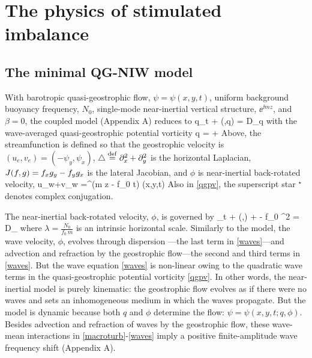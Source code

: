 \documentclass{jfm}
\begin{document}
\section{The physics of stimulated imbalance}

\subsection{The \cite{xie_vanneste2015} minimal QG-NIW model}

With barotropic quasi-geostrophic flow, $\psi=\psi(x,y,t)$,
uniform background buoyancy frequency, $N_0$,
single-mode near-inertial vertical structure, $\ee^{\ii m z}$, and
 $\beta = 0$, the \cite{xie_vanneste2015}
coupled model (Appendix A) reduces to
\beq
\label{macroturb}
q_t + \sJ(\psi,q) = D_q\com
\eeq
with the wave-averaged quasi-geostrophic potential vorticity
\beq
\label{qgpv}
q = \lap \psi +
                 \per
\eeq
Above, the streamfunction is defined so that the geostrophic velocity is
$(u_e, v_e) = (-\psi_y, \psi_x)$, $\triangle \stackrel{\mathrm{def}}{=} \partial_x^2 + \partial_y^2$ is the horizontal
Laplacian, $J(f,g)=f_x g_y - f_y g_x$ is the lateral Jacobian, and $\phi$
is near-inertial back-rotated velocity,
\beq
\label{niw_velocity}
u_w+\ii v_w  =\ee^{\ii (m z - f_0 t)} \phi(x,y,t)\per
\eeq
Also in \eqref{qgpv}, the superscript star $^\star$ denotes complex conjugation.

The near-inertial back-rotated velocity, $\phi$, is governed by
\beq
\label{waves}
\phi_t + \sJ(\psi,\phi) + \phi\lap \psi -  f_0 \lambda^2 \lap \phi
 = D_\phi\com
\eeq
where $\lambda = \tfrac{N_0}{f_0\, m}$  is an intrinsic horizontal scale.
Similarly to the \cite{young_benjelloul1997} model, the wave velocity, $\phi$,
evolves through dispersion ---the last term in \eqref{waves}---and
advection and refraction by the geostrophic flow---the second and third terms in
\eqref{waves}. But the wave equation \eqref{waves} is non-linear owing to the
quadratic wave terms in the quasi-geostrophic potential vorticity \eqref{qgpv}. In other
words, the
\cite{young_benjelloul1997} near-inertial model is purely kinematic: the geostrophic
flow evolves as if there were no waves and sets an
inhomogeneous medium in which the waves propagate.
But the \cite{xie_vanneste2015} model is dynamic because both $q$ and $\phi$
determine the flow: $\psi=\psi(x,y,t; q, \phi)$. Besides advection and refraction of waves
by the geostrophic flow, these wave-mean interactions in \eqref{macroturb}-\eqref{waves}
imply a positive finite-amplitude wave frequency shift (Appendix A).
\end{document}
